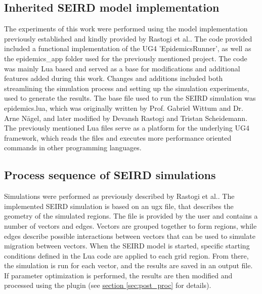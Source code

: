 \subsection{Inherited SEIRD model implementation}
The experiments of this work were  performed using the model implementation previously established and kindly provided by
Rastogi et al.\cite{Rastogi}. The code provided included a functional implementation of the UG4 'EpidemicsRunner', as well as
the epidemics\_app folder used for  the previously mentioned project. The code was mainly Lua based and served as a base
for modifications and additional features added during this work. Changes and additions included both streamlining the simulation process
and setting up the simulation experiments, used to generate the results. The base file used to run the SEIRD simulation was epidemics.lua,
which was originally written by Prof. Gabriel Wittum and Dr. Arne N\"agel, and later modified by Devansh Rastogi and Tristan Scheidemann.
The previously mentioned Lua files serve as a platform for the underlying UG4 framework, which reads the files and executes more
performance oriented commands in other programming languages. 

\subsection{Process sequence of SEIRD simulations}
Simulations were performed as previously described by Rastogi et al.\cite{Rastogi}.
The implemented SEIRD simulation is based on an ugx file, that describes the geometry of the simulated regions. The file is provided
by the user and contains a number of vectors and edges. Vectors are grouped together to form regions, while edges describe possible
interactions between vectors that can be used to simulate migration between vectors. When the SEIRD model is started, specific starting
conditions defined in the Lua code are applied to each grid region. From there, the simulation is run for each
vector, and the results are saved in an output file. If parameter optimization is performed, the results are then modified and processed
using the  plugin (see \hyperref[sec:post_proc]{section \ref*{sec:post_proc}} for details).


